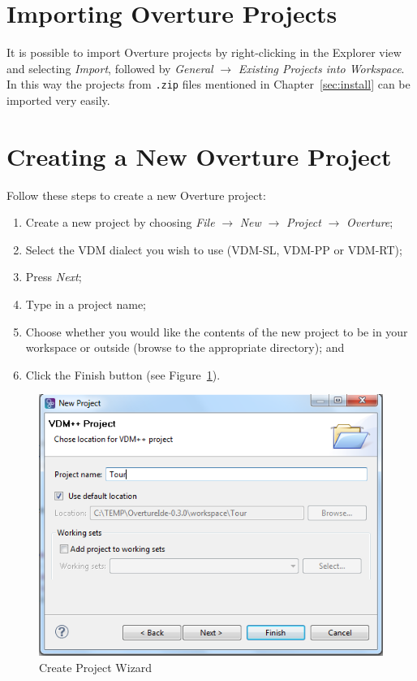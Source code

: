 \documentclass{overturerepchap}
\begin{document}
\section{Importing Overture Projects}\label{subsec:importproj}

It is possible to import Overture projects by
right-clicking in the Explorer view and selecting \emph{Import}, followed
by \emph{General} $\rightarrow$ \emph{Existing Projects into
  Workspace}.  In this way the projects from \texttt{.zip} files
mentioned in Chapter~\ref{sec:install} can be imported very
easily.  

\section{Creating a New Overture Project}

Follow these steps to create a new Overture project:

\begin{enumerate}
	\item Create a new project by choosing \emph{File}
          $\rightarrow$ \emph{New} $\rightarrow$ \emph{Project}
          $\rightarrow$ \emph{Overture}; 
	\item Select the VDM dialect you wish to use (VDM-SL, VDM-PP
          or VDM-RT);
	\item Press \emph{Next};
         \item Type in a project name;
	\item Choose whether you would like the contents of the new
          project to be in your workspace or outside
          (browse to the appropriate directory); and
    \item Click	the Finish button (see Figure~\ref{fig:CreateProjectWizard}).
\end{enumerate}

\begin{figure}[!htb]
	\begin{center}
	  \includegraphics[scale=0.8]{figures/CreateProjectWizard}
	  \caption[Create Project Wizard]{Create Project Wizard}
	  \label{fig:CreateProjectWizard}
	\end{center}
\end{figure}
\end{document}
